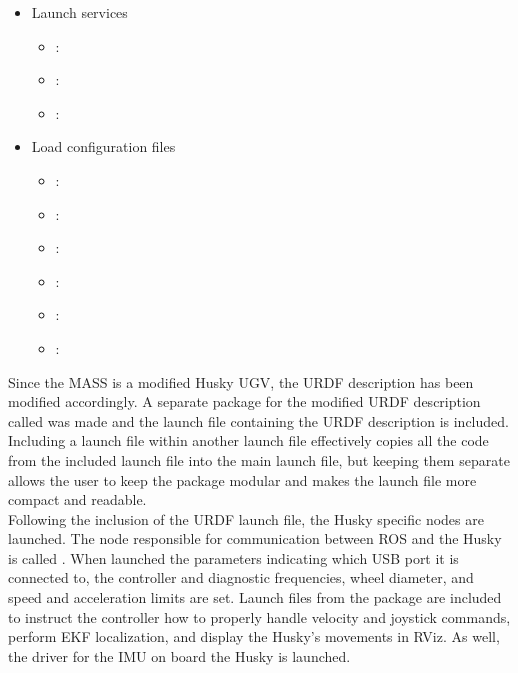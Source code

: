 \begin{itemize}
\begin{itemize}
\end{itemize}

\item Launch services

\begin{itemize}

\item {} : 
\item {} : 
\item {} : 

\end{itemize}

\item Load configuration files

\begin{itemize}

\item {} : 
\item {} : 
\item {} : 
\item {} : 
\item {} : 
\item {} : 
\end{itemize}

\end{itemize}

Since the MASS is a modified Husky UGV, the URDF description has been modified accordingly. A separate package for the modified URDF description called  was made and the launch file containing the URDF description is included. Including a launch file within another launch file effectively copies all the code from the included launch file into the main launch file, but keeping them separate allows the user to keep the package modular and makes the launch file more compact and readable.\\

Following the inclusion of the URDF launch file, the Husky specific nodes are launched. The node responsible for communication between ROS and the Husky is called . When launched the parameters indicating which USB port it is connected to, the controller and diagnostic frequencies, wheel diameter, and speed and acceleration limits are set. Launch files from the  package are included to instruct the controller how to properly handle  velocity and joystick commands, perform EKF localization, and display the Husky's movements in RViz. As well, the driver for the IMU on board the Husky is launched.\\

